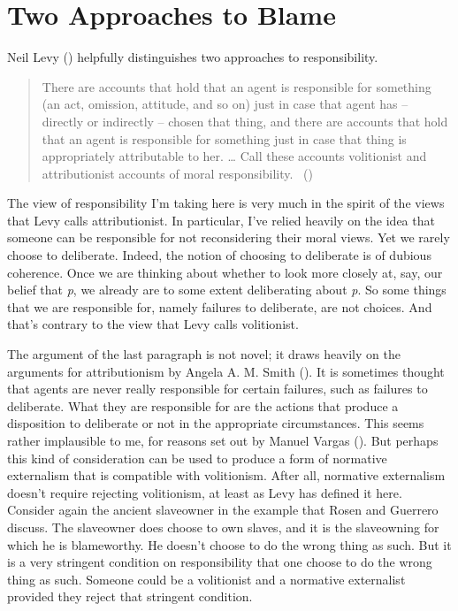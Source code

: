 \documentclass[
  10pt,
  letterpaper,
  twoside]{scrbook}
\begin{document}
\section{Two Approaches to Blame}\label{twoapproachestoblame}

Neil Levy () helpfully distinguishes two
approaches to responsibility.

\begin{quote}
There are accounts that hold that an agent is responsible for something
(an act, omission, attitude, and so on) just in case that agent has --
directly or indirectly -- chosen that thing, and there are accounts that
hold that an agent is responsible for something just in case that thing
is appropriately attributable to her. \ldots{} Call these accounts
volitionist and attributionist accounts of moral responsibility.
~()
\end{quote}

The view of responsibility I'm taking here is very much in the spirit of
the views that Levy calls attributionist. In particular, I've relied
heavily on the idea that someone can be responsible for not
reconsidering their moral views. Yet we rarely choose to deliberate.
Indeed, the notion of choosing to deliberate is of dubious coherence.
Once we are thinking about whether to look more closely at, say, our
belief that \emph{p}, we already are to some extent deliberating about
\emph{p}. So some things that we are responsible for, namely failures to
deliberate, are not choices. And that's contrary to the view that Levy
calls volitionist.

The argument of the last paragraph is not novel; it draws heavily on the
arguments for attributionism by Angela A. M. Smith
(). It is sometimes thought that
agents are never really responsible for certain failures, such as
failures to deliberate. What they are responsible for are the actions
that produce a disposition to deliberate or not in the appropriate
circumstances. This seems rather implausible to me, for reasons set out
by Manuel Vargas (). But perhaps this
kind of consideration can be used to produce a form of normative
externalism that is compatible with volitionism. After all, normative
externalism doesn't require rejecting volitionism, at least as Levy has
defined it here. Consider again the ancient slaveowner in the example
that Rosen and Guerrero discuss. The slaveowner does choose to own
slaves, and it is the slaveowning for which he is blameworthy. He
doesn't choose to do the wrong thing as such. But it is a very stringent
condition on responsibility that one choose to do the wrong thing as
such. Someone could be a volitionist and a normative externalist
provided they reject that stringent condition.
\end{document}
